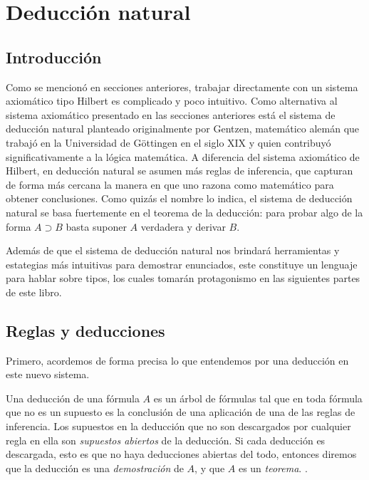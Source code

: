 \documentclass{article}
\begin{document}
\section{Deducción natural}\label{sec:deduccion_natural}
\subsection{Introducción}

Como se mencionó en secciones anteriores, trabajar directamente con un sistema axiomático tipo Hilbert es complicado y poco intuitivo. Como alternativa al sistema axiomático presentado en las secciones anteriores está el sistema de deducción natural planteado originalmente por Gentzen, matemático alemán que trabajó en la Universidad de Göttingen en el siglo XIX y quien contribuyó significativamente a la lógica matemática. A diferencia del sistema axiomático de Hilbert, en deducción natural se asumen más reglas de inferencia, que capturan de forma más cercana la manera en que uno razona como matemático para obtener conclusiones. Como quizás el nombre lo indica, el sistema de deducción natural se basa fuertemente en el teorema de la deducción: para probar algo de la forma $A \supset B$ basta suponer $A$ verdadera y derivar $B$. 

Además de que el sistema de deducción natural nos brindará herramientas y estategias más intuitivas para demostrar enunciados, este constituye un lenguaje para hablar sobre tipos, los cuales tomarán protagonismo en las siguientes partes de este libro.

\subsection{Reglas y deducciones}

Primero, acordemos de forma precisa lo que entendemos por una deducción en este nuevo sistema.
\begin{definition}
    Una deducción de una fórmula $A$ es un árbol de fórmulas tal que en toda fórmula que no es un supuesto es la conclusión de una aplicación de una de las reglas de inferencia.
    Los supuestos en la deducción que no son descargados por cualquier regla en ella son \emph{supuestos abiertos} de la deducción.
    Si cada deducción es descargada, esto es que no haya deducciones abiertas del todo, entonces diremos que la deducción es una \emph{demostración} de $A$, y que $A$ es un \emph{teorema}. \cite{PaoloMancosu56}.
\end{definition}
\end{document}
